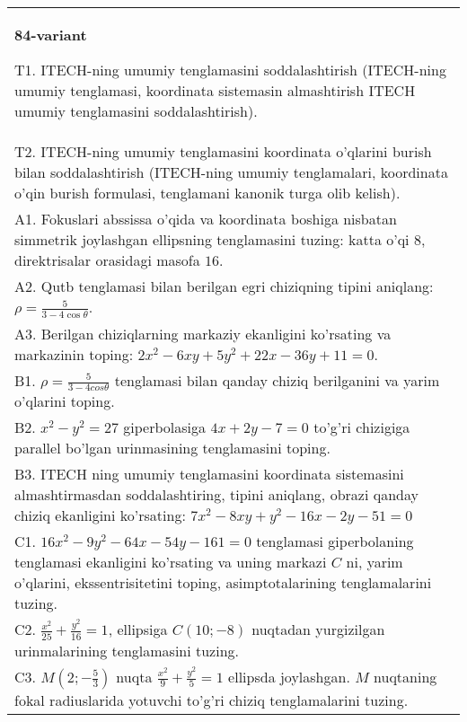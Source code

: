 \documentclass{article}
\begin{document}
\begin{tabular}{m{17cm}}
\textbf{84-variant}
\newline

T1. ITECH-ning umumiy tenglamasini soddalashtirish (ITECH-ning umumiy tenglamasi, koordinata sistemasin almashtirish ITECH umumiy tenglamasini soddalashtirish).\\

T2. ITECH-ning umumiy tenglamasini koordinata o'qlarini burish bilan soddalashtirish (ITECH-ning umumiy tenglamalari, koordinata o'qin burish formulasi, tenglamani kanonik turga olib kelish).\\

A1. Fokuslari abssissa o'qida va koordinata boshiga nisbatan simmetrik joylashgan ellipsning tenglamasini tuzing: katta o'qi $8$, direktrisalar orasidagi masofa $16$.\\

A2. Qutb tenglamasi bilan berilgan egri chiziqning tipini aniqlang: $\rho=\frac{5}{3-4\cos\theta}$.\\

A3. Berilgan chiziqlarning markaziy ekanligini ko'rsating va markazinin toping: $2x^{2}-6xy+5y^{2}+22x-36y+11=0$.\\

B1. $\rho = \frac{5}{3 - 4cos\theta}$ tenglamasi bilan qanday chiziq berilganini va yarim o'qlarini toping.  \\

B2. $x^{2} - y^{2} = 27$ giperbolasiga $4x + 2y - 7 = 0$ to'g'ri chizigiga parallel bo'lgan urinmasining tenglamasini toping.  \\

B3. ITECH ning umumiy tenglamasini koordinata sistemasini almashtirmasdan soddalashtiring, tipini aniqlang, obrazi qanday chiziq ekanligini ko'rsating: $7x^{2} - 8xy + y^{2} - 16x - 2y - 51 = 0$\\

C1. $16x^{2} - 9y^{2} - 64x - 54y - 161 = 0$ tenglamasi giperbolaning tenglamasi ekanligini ko'rsating va uning markazi $C$ ni, yarim o'qlarini, ekssentrisitetini toping, asimptotalarining tenglamalarini tuzing.  \\

C2. $\frac{x^{2}}{25} + \frac{y^{2}}{16} = 1$, ellipsiga $C(10; - 8)$ nuqtadan yurgizilgan urinmalarining tenglamasini tuzing.  \\

C3. $M(2; - \frac{5}{3})$ nuqta $\frac{x^{2}}{9} + \frac{y^{2}}{5} = 1$ ellipsda joylashgan. $M$ nuqtaning fokal radiuslarida yotuvchi to'g'ri chiziq tenglamalarini tuzing.  \\

\end{tabular}
\vspace{1cm}
\end{document}
